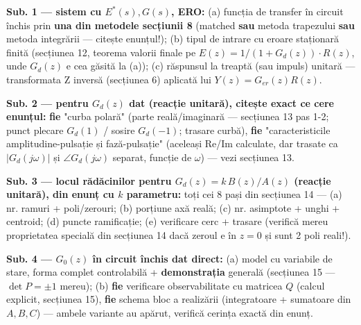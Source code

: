 \documentclass[10pt,a4paper]{article}
\begin{document}
\begin{keyeq}\color{red!65!black}
\textbf{Sub. 1 — sistem cu $E^*(s),G(s)$, ERO:} (a) funcția de transfer în circuit închis prin \textbf{una din metodele secțiunii 8} (matched \textbf{sau} metoda trapezului \textbf{sau} metoda integrării — citește enunțul!); (b) tipul de intrare cu eroare staționară finită (secțiunea 12, teorema valorii finale pe $E(z)=1/(1+G_d(z))\cdot R(z)$, unde $G_d(z)$ e cea găsită la (a)); (c) răspunsul la treaptă (sau impuls) unitară — transformata Z inversă (secțiunea 6) aplicată lui $Y(z)=G_{er}(z)R(z)$.
\end{keyeq}

\begin{keyeq}\color{red!65!black}
\textbf{Sub. 2 — pentru $G_d(z)$ dat (reacție unitară), citește exact ce cere enunțul:} \textbf{fie} "curba polară" (parte reală/imaginară — secțiunea 13 pas 1-2; punct plecare $G_d(1)$ / sosire $G_d(-1)$; trasare curbă), \textbf{fie} "caracteristicile amplitudine-pulsație și fază-pulsație" (aceleași Re/Im calculate, dar trasate ca $|G_d(j\omega)|$ și $\angle G_d(j\omega)$ separat, funcție de $\omega$) — vezi secțiunea 13.
\end{keyeq}

\begin{keyeq}\color{red!65!black}
\textbf{Sub. 3 — locul rădăcinilor pentru $G_d(z)=k\,B(z)/A(z)$ (reacție unitară), din enunț cu $k$ parametru:} toți cei 8 pași din secțiunea 14 — (a) nr. ramuri + poli/zerouri; (b) porțiune axă reală; (c) nr. asimptote + unghi + centroid; (d) puncte ramificație; (e) verificare cerc + trasare (verifică mereu proprietatea specială din secțiunea 14 dacă zeroul e în $z{=}0$ și sunt 2 poli reali!).
\end{keyeq}

\begin{keyeq}\color{red!65!black}
\textbf{Sub. 4 — $G_0(z)$ în circuit închis dat direct:} (a) model cu variabile de stare, forma complet controlabilă + \textbf{demonstrația} generală (secțiunea 15 — $\det P=\pm1$ mereu); (b) \textbf{fie} verificare observabilitate cu matricea $Q$ (calcul explicit, secțiunea 15), \textbf{fie} schema bloc a realizării (integratoare + sumatoare din $A,B,C$) — ambele variante au apărut, verifică cerința exactă din enunț.
\end{keyeq}
\end{document}

